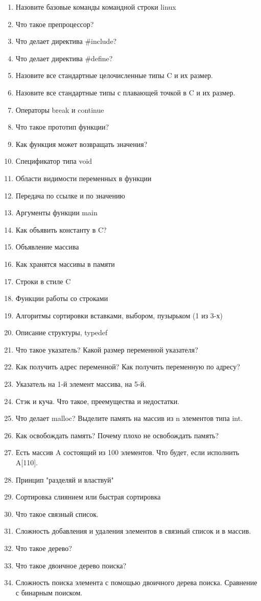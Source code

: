 \documentclass[12pt]{article}
\begin{document}
\begin{enumerate}

\item Назовите базовые команды командной строки linux
\item Что такое препроцессор?
\item Что делает директива \#include?
\item Что делает директива \#define?
\item Назовите все стандартные целочисленные типы C и их размер.
\item Назовите все стандартные типы с плавающей точкой в C и их размер.
\item Операторы break и continue
\item Что такое прототип функции?
\item Как функция может возвращать значения?
\item Спецификатор типа void
\item Области видимости переменных в функции
\item Передача по ссылке и по значению
\item Аргументы функции main
\item Как объявить константу в C?
\item Объявление массива
\item Как хранятся массивы в памяти
\item Строки в стиле C
\item Функции работы со строками
\item Алгоритмы сортировки вставками, выбором, пузырьком (1 из 3-х)
\item Описание структуры, typedef
\item Что такое указатель? Какой размер переменной указателя? 
\item Как получить адрес переменной? Как получить переменную по адресу?
\item Указатель на 1-й элемент массива, на 5-й.
\item Стэк и куча. Что такое, преемущества и недостатки.
\item Что делает malloc? Выделите память на массив из n элементов типа int.
\item Как освобождать память? Почему плохо не освобождать память?
\item Есть массив A состоящий из 100 элементов. Что будет, если исполнить A[110].
\item Принцип "разделяй и властвуй"
\item Сортировка слиянием или быстрая сортировка
\item Что такое связный список.
\item Сложность добавления и удаления элементов в связный список и в массив.
\item Что такое дерево?
\item Что такое двоичное дерево поиска? 
\item Сложность поиска элемента с помощью двоичного дерева поиска. Сравнение с бинарным поиском.
\end{enumerate}

\fi
\end{document}
